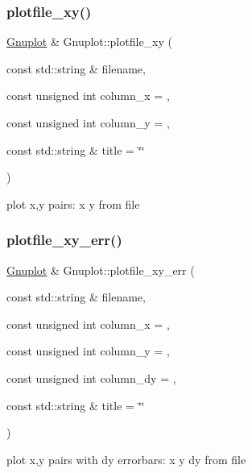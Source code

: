 \subsubsection{\texorpdfstring{plotfile\+\_\+xy()}{plotfile\_xy()}}
{\footnotesize\ttfamily \hyperlink{class_gnuplot}{Gnuplot} \& Gnuplot\+::plotfile\+\_\+xy (\begin{DoxyParamCaption}\item[{const std\+::string \&}]{filename,  }\item[{const unsigned int}]{column\+\_\+x = {},  }\item[{const unsigned int}]{column\+\_\+y = {},  }\item[{const std\+::string \&}]{title = {\ttfamily \char`\"{}\char`\"{}} }\end{DoxyParamCaption})}

plot x,y pairs\+: x y from file \mbox{\label{class_gnuplot_afe9d44ba12f617188111ab915010f3ab}} 
\subsubsection{\texorpdfstring{plotfile\+\_\+xy\+\_\+err()}{plotfile\_xy\_err()}}
{\footnotesize\ttfamily \hyperlink{class_gnuplot}{Gnuplot} \& Gnuplot\+::plotfile\+\_\+xy\+\_\+err (\begin{DoxyParamCaption}\item[{const std\+::string \&}]{filename,  }\item[{const unsigned int}]{column\+\_\+x = {},  }\item[{const unsigned int}]{column\+\_\+y = {},  }\item[{const unsigned int}]{column\+\_\+dy = {},  }\item[{const std\+::string \&}]{title = {\ttfamily \char`\"{}\char`\"{}} }\end{DoxyParamCaption})}

plot x,y pairs with dy errorbars\+: x y dy from file \mbox{\label{class_gnuplot_a9dbde2a91eb816481657f3a22c9b0046}} 
